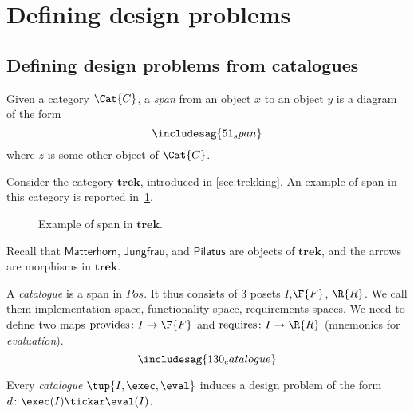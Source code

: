 \section{Defining design problems}
\subsection{Defining design problems from catalogues}
\begin{shaded}
\begin{definition}[Span]
Given a category $\Cat{C}$, a \emph{span} from an object $x$ to an object $y$ is a diagram of the form
\begin{equation}
\includesag{51_span}
\end{equation}
where $z$ is some other object of $\Cat{C}$. 
\end{definition}
\end{shaded}
\begin{example}
Consider the category $\mathbf{trek}$, introduced in \cref{sec:trekking}. An example of span in this category is reported in~\cref{fig:exmountains}.
\begin{figure}[h!]
\begin{center}
\end{center}
\caption{Example of span in $\mathbf{trek}$. \label{fig:exmountains}}
\end{figure}
Recall that $\mathsf{Matterhorn}$, $\mathsf{Jungfrau}$, and $\mathsf{Pilatus}$ are objects of $\mathbf{trek}$, and the arrows are morphisms in $\mathbf{trek}$.
\end{example}

\begin{definition}[Catalogue] \label{def:catalogue}
A \emph{catalogue} is a span in $Pos$.
It thus consists of 3 posets $I$,$\F{F}$, $\R{R}$.
We call them implementation space, functionality space, requirements spaces. We need to define two maps $\text{provides} \colon I \to \F{F}$
and $\text{requires} \colon I \to \R{R}$ (mnemonics for \emph{evaluation}).
\begin{equation}
\includesag{130_catalogue}
\end{equation}
\end{definition}

\begin{definition}
Every \emph{catalogue} $\tup{I,\exec,\eval}$ induces a design problem of the form $d\colon \exec(I)\tickar \eval(I)$.
\end{definition}
\begin{example}
\end{example}

